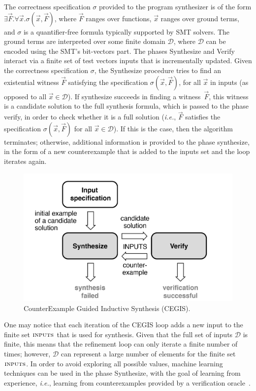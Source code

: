 \documentclass[format=acmsmall, review=false, screen=true]{acmart}
\begin{document}
The correctness specification $\sigma$ provided to the program synthesizer is of the form $\exists \vec{F} .  \forall \vec{x}.  \sigma(\vec{x}, \vec{F})$, where $\vec{F}$ ranges over functions, $\vec{x}$ ranges over ground terms, and $\sigma$ is a quantifier-free formula typically supported by SMT solvers. The ground terms are interpreted over some finite domain $\mathcal{D}$, where $\mathcal{D}$ can be encoded using the SMT's bit-vectors part. The phases {\sc Synthesize} and {\sc Verify} interact via a finite set of test vectors {\sc inputs} that is incrementally updated. Given the correctness specification $\sigma$, the {\sc Synthesize} procedure tries to find an existential witness $\vec{F}$ satisfying the specification $\sigma(\vec{x}, \vec{F})$, for all $\vec{x}$ in {\sc inputs} (as opposed to all $\vec{x} \in \mathcal{D}$). If {\sc synthesize} succeeds in finding a witness~$\vec{F}$, this witness is a candidate solution to the full synthesis formula, which is passed to the phase {\sc verify}, in order to check whether it is a full solution ({\it i.e.}, $\vec{F}$ satisfies the specification $\sigma(\vec{x}, \vec{F})$ for all $\vec{x}\in\mathcal{D}$). If this is the case, then the algorithm terminates; otherwise, additional information is provided to the phase {\sc synthesize}, in the form of a new counterexample that is added to the {\sc inputs} set and the loop iterates again. 
%
\begin{figure}[h]
	\centering
	\includegraphics[scale=0.5]{figure3.jpg}
	\caption{CounterExample Guided Inductive Synthesis (CEGIS).}
	\label{Counter-Example-Guided-Inductive-Synthesis}
\end{figure}

One may notice that each iteration of the CEGIS loop adds a new input to the finite set $\text{\sc inputs}$ that is used for synthesis.  Given that the full set of inputs $\mathcal{D}$ is finite, this means that the refinement loop can only iterate a finite number of times; however, $\mathcal{D}$ can represent a large number of elements for the finite set $\text{\sc inputs}$. In order to avoid exploring all possible values, machine learning techniques can be used in the phase {\sc Synthesize}, with the goal of learning from experience, {\it i.e.}, learning from counterexamples provided by a verification oracle~\cite{Alur13}.
\end{document}
